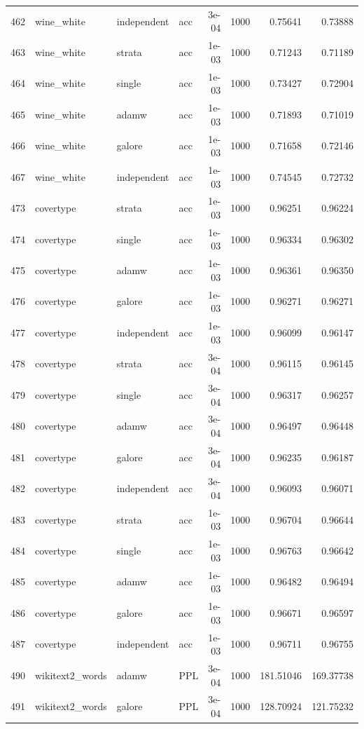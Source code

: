 \begin{longtable}{rlllrrrr}
462 & wine\_white & independent & acc & 3e-04 & 1000 & 0.75641 & 0.73888 \\
\rowcolor{oursbg}
463 & wine\_white & strata & acc & 1e-03 & 1000 & 0.71243 & 0.71189 \\
464 & wine\_white & single & acc & 1e-03 & 1000 & 0.73427 & 0.72904 \\
465 & wine\_white & adamw & acc & 1e-03 & 1000 & 0.71893 & 0.71019 \\
466 & wine\_white & galore & acc & 1e-03 & 1000 & 0.71658 & 0.72146 \\
467 & wine\_white & independent & acc & 1e-03 & 1000 & 0.74545 & 0.72732 \\
\rowcolor{oursbg}
473 & covertype & strata & acc & 1e-03 & 1000 & 0.96251 & 0.96224 \\
474 & covertype & single & acc & 1e-03 & 1000 & 0.96334 & 0.96302 \\
475 & covertype & adamw & acc & 1e-03 & 1000 & 0.96361 & 0.96350 \\
476 & covertype & galore & acc & 1e-03 & 1000 & 0.96271 & 0.96271 \\
477 & covertype & independent & acc & 1e-03 & 1000 & 0.96099 & 0.96147 \\
\rowcolor{oursbg}
478 & covertype & strata & acc & 3e-04 & 1000 & 0.96115 & 0.96145 \\
479 & covertype & single & acc & 3e-04 & 1000 & 0.96317 & 0.96257 \\
480 & covertype & adamw & acc & 3e-04 & 1000 & 0.96497 & 0.96448 \\
481 & covertype & galore & acc & 3e-04 & 1000 & 0.96235 & 0.96187 \\
482 & covertype & independent & acc & 3e-04 & 1000 & 0.96093 & 0.96071 \\
\rowcolor{oursbg}
483 & covertype & strata & acc & 1e-03 & 1000 & 0.96704 & 0.96644 \\
484 & covertype & single & acc & 1e-03 & 1000 & 0.96763 & 0.96642 \\
485 & covertype & adamw & acc & 1e-03 & 1000 & 0.96482 & 0.96494 \\
486 & covertype & galore & acc & 1e-03 & 1000 & 0.96671 & 0.96597 \\
487 & covertype & independent & acc & 1e-03 & 1000 & 0.96711 & 0.96755 \\
490 & wikitext2\_words & adamw & PPL & 3e-04 & 1000 & 181.51046 & 169.37738 \\
491 & wikitext2\_words & galore & PPL & 3e-04 & 1000 & 128.70924 & 121.75232 \\

\end{longtable}

